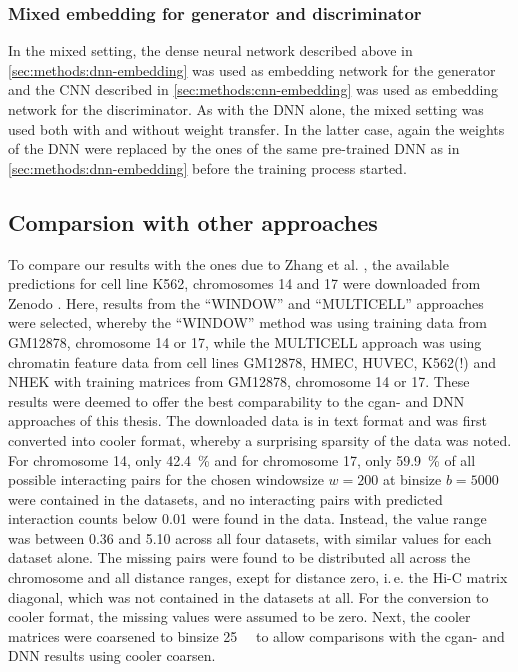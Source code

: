 \subsubsection{Mixed embedding for generator and discriminator} \label{sec:methods:mixed-embedding}
In the mixed setting, the dense neural network described above in \cref{sec:methods:dnn-embedding} was used as  
embedding network for the generator and the CNN described in \cref{sec:methods:cnn-embedding} was used as embedding
network for the discriminator.
As with the DNN alone, the mixed setting was used both with and without weight transfer.
In the latter case, again the weights of the DNN were replaced by the ones of the same pre-trained DNN as in \cref{sec:methods:dnn-embedding}
 before the training process started.

\subsection{Comparsion with other approaches} \label{sec:methods:comparison}
To compare our results with the ones due to Zhang et al. \cite{Zhang2019},
the available predictions for cell line K562, chromosomes 14 and 17 were downloaded from Zenodo \cite{ShiluZhang2019,ShiluZhang2019a}.
Here, results from the ``WINDOW'' and ``MULTICELL'' approaches were selected, whereby the ``WINDOW'' method was using training data from GM12878, chromosome 14 or 17, 
while the MULTICELL approach was using chromatin feature data from cell lines GM12878, HMEC, HUVEC, K562(!) and NHEK with training matrices from GM12878, chromosome 14 or 17.
These results were deemed to offer the best comparability to the \acrshort{cgan}- and DNN approaches of this thesis.
The downloaded data is in text format and was first converted into cooler format, whereby a surprising sparsity of the data was noted.
For chromosome 14, only \SI{42.4}{\percent} and for chromosome 17, only \SI{59.9}{\percent} of all possible interacting pairs 
for the chosen windowsize $w=200$ at binsize $b=5000$ were contained in the datasets, 
and no interacting pairs with predicted interaction counts below 0.01 were found in the data. 
Instead, the value range was between 0.36 and 5.10 across all four datasets, with similar values for each dataset alone.
The missing pairs were found to be distributed all across the chromosome and all distance ranges, exept for distance zero, i.\,e. the Hi-C matrix diagonal, which was not contained in the datasets at all.
For the conversion to cooler format, the missing values were assumed to be zero.
Next, the cooler matrices were coarsened to binsize \SI{25}{\kilo\bp} to allow comparisons with the \acrshort{cgan}- and DNN results using cooler coarsen.

